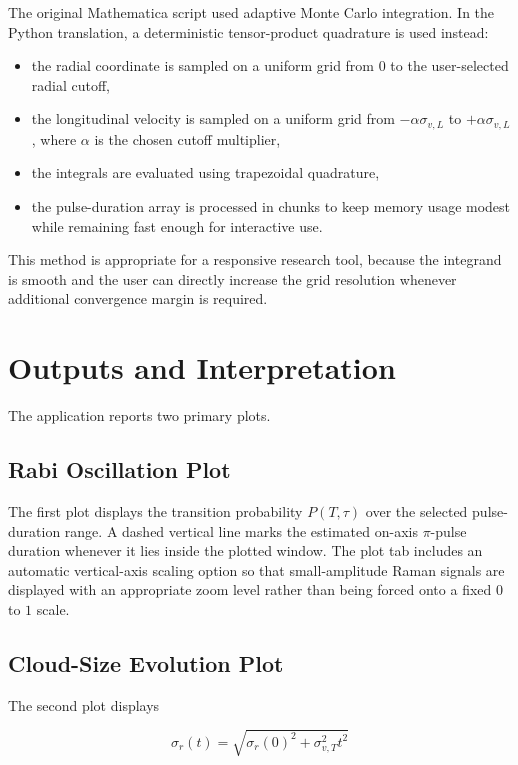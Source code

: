 \documentclass[11pt,a4paper]{article}
\begin{document}
The original Mathematica script used adaptive Monte Carlo integration. In the Python translation, a
deterministic tensor-product quadrature is used instead:

\begin{itemize}
  \item the radial coordinate is sampled on a uniform grid from $0$ to the user-selected radial cutoff,
  \item the longitudinal velocity is sampled on a uniform grid from
  $-\alpha \sigma_{v,L}$ to $+\alpha \sigma_{v,L}$, where $\alpha$ is the chosen cutoff multiplier,
  \item the integrals are evaluated using trapezoidal quadrature,
  \item the pulse-duration array is processed in chunks to keep memory usage modest while remaining fast enough for interactive use.
\end{itemize}

This method is appropriate for a responsive research tool, because the integrand is smooth and the
user can directly increase the grid resolution whenever additional convergence margin is required.

\section{Outputs and Interpretation}

The application reports two primary plots.

\subsection{Rabi Oscillation Plot}

The first plot displays the transition probability $P(T,\tau)$ over the selected pulse-duration
range. A dashed vertical line marks the estimated on-axis $\pi$-pulse duration whenever it lies
inside the plotted window. The plot tab includes an automatic vertical-axis scaling option so that
small-amplitude Raman signals are displayed with an appropriate zoom level rather than being forced
onto a fixed $0$ to $1$ scale.

\subsection{Cloud-Size Evolution Plot}

The second plot displays

\begin{equation}
\sigma_r(t) = \sqrt{\sigma_r(0)^2 + \sigma_{v,T}^2 t^2}
\end{equation}
\end{document}
